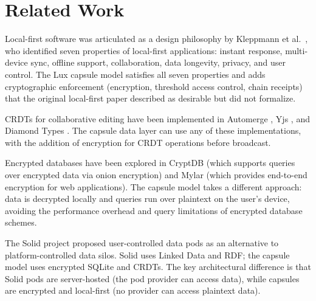 \section{Related Work}
\label{sec:related}

Local-first software was articulated as a design philosophy by Kleppmann
et al.\ \cite{kleppmann2019localfirst}, who identified seven properties
of local-first applications: instant response, multi-device sync, offline
support, collaboration, data longevity, privacy, and user control. The
Lux capsule model satisfies all seven properties and adds cryptographic
enforcement (encryption, threshold access control, chain receipts) that
the original local-first paper described as desirable but did not
formalize.

CRDTs for collaborative editing have been implemented in Automerge
\cite{kleppmann2017automerge}, Yjs \cite{nicolaescu2015yjs}, and
Diamond Types \cite{josephg2023diamond}. The capsule data layer can
use any of these implementations, with the addition of encryption
for CRDT operations before broadcast.

Encrypted databases have been explored in CryptDB \cite{popa2011cryptdb}
(which supports queries over encrypted data via onion encryption) and
Mylar \cite{popa2014mylar} (which provides end-to-end encryption for web
applications). The capsule model takes a different approach: data is
decrypted locally and queries run over plaintext on the user's device,
avoiding the performance overhead and query limitations of encrypted
database schemes.

The Solid project \cite{bernerslee2016solid} proposed user-controlled
data pods as an alternative to platform-controlled data silos. Solid
uses Linked Data and RDF; the capsule model uses encrypted SQLite and
CRDTs. The key architectural difference is that Solid pods are
server-hosted (the pod provider can access data), while capsules are
encrypted and local-first (no provider can access plaintext data).

